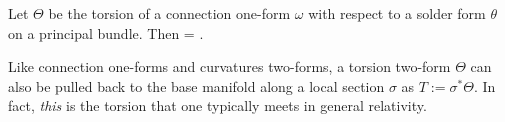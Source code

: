 Let $\Theta$ be the torsion of a connection one-form $\omega$ with respect to a solder form $\theta$ on a principal bundle. Then
\bse
\D \Theta = \Omega \halfWedge \theta.
\ese
\et

\br
Like connection one-forms and curvatures two-forms, a torsion two-form $\Theta$ can also be pulled back to the base manifold along a local section $\sigma$ as $T:=\sigma^*\Theta$. In fact, \emph{this} is the torsion that one typically meets in general relativity.
\er






